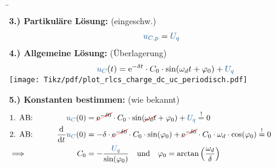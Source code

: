 \begin{frame}\ftx{\subsubsecname}%
    \b{%
    \begin{minipage}{\textwidth}\centering
        \begin{minipage}[t][3cm][]{0.5\textwidth}%
            \textbf{3.) Partikuläre Lösung:} (eingeschw.)%
            \begin{align*}
                &&
                    \ecv{u_{C,\mathrm{p}}} &= \ecv{U_q}
                \end{align*}
            \textbf{4.) Allgemeine Lösung:} (Überlagerung)%
            \begin{align*}
                &&
                    \ecv{u_C}(t) &= \mathrm{e}^{-\delta t} \cdot C_0 \cdot \sin(\omega_d t + \varphi_0) + \ecv{U_q} \nonumber\\[-14pt]
            \end{align*}
        \end{minipage}%
        \begin{minipage}[t][3cm][]{0.5\textwidth}\centering
            \vspace{10pt}
            \texttt{[image: Tikz/pdf/plot\_rlcs\_charge\_dc\_uc\_periodisch.pdf]}
        \end{minipage}
    \end{minipage}\vspace{15pt}
    \textbf{5.) Konstanten bestimmen:} (wie bekannt)
    \begin{align*}
        &\hphantom{1Rooooooo}&\hphantom{2Loooooo}&\hphantom{2Roooooooooooooooooooooooooooooooooo}&\hphantom{3Loooooo}&\hphantom{3Roooooooooo} \nonumber\\[-15pt] %
        &\text{1. AB:}&
            \ecv{u_C}(0) &= \redcancel{\mathrm{e}^{-\delta 0}} \cdot C_0 \cdot \sin(\redcancel{\omega_d t } + \varphi_0) + \ecv{U_q} \overset{!}{=} 0 \nonumber\\
        &\text{2. AB:}&
            \dt \ecv{u_C}(0) &= -\delta \cdot \redcancel{\mathrm{e}^{-\delta 0}} \cdot C_0 \cdot \sin(\varphi_0) + \mathrlap{\redcancel{\mathrm{e}^{-\delta 0}} \cdot C_0 \cdot \omega_d \cdot \cos(\varphi_0) \overset{!}{=} 0 }\nonumber\\
        &\Longrightarrow&
        C_0 &=  -\frac{\ecv{U_q}}{\sin(\varphi_0)} \quad\text{und}\quad
            \varphi_0 = \arctan\left(\frac{\omega_d}{\delta}\right)

\end{align*}}
\end{frame}

